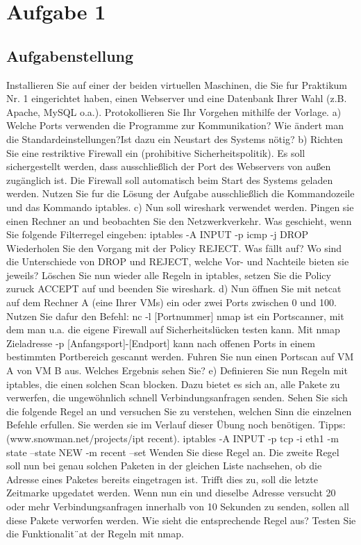 \newpage
\section{Aufgabe 1}
\subsection{Aufgabenstellung}
Installieren Sie auf einer der beiden virtuellen Maschinen, die Sie fur Praktikum Nr. 1 eingerichtet haben, einen Webserver und eine Datenbank Ihrer Wahl (z.B. Apache, MySQL o.a.). Protokollieren Sie Ihr Vorgehen mithilfe der Vorlage.
a) Welche Ports verwenden die Programme zur Kommunikation? Wie ändert man die Standardeinstellungen?Ist dazu ein Neustart des Systems nötig?
b) Richten Sie eine restriktive Firewall ein (prohibitive Sicherheitspolitik). Es soll sichergestellt werden, dass ausschließlich der Port des Webservers von außen zugänglich ist. Die Firewall soll automatisch beim Start des Systems geladen werden. Nutzen Sie fur die Lösung der Aufgabe ausschließlich die Kommandozeile und das Kommando iptables.
c) Nun soll wireshark verwendet werden. Pingen sie einen Rechner an und beobachten Sie den Netzwerkverkehr. Was geschieht, wenn Sie folgende Filterregel eingeben: iptables -A INPUT -p icmp -j DROP Wiederholen Sie den Vorgang mit der Policy REJECT. Was fällt auf? Wo sind die Unterschiede von DROP und REJECT, welche Vor- und Nachteile bieten sie jeweils? Löschen Sie nun wieder alle Regeln in iptables, setzen Sie die Policy zuruck ACCEPT auf und beenden Sie wireshark.
d) Nun öffnen Sie mit netcat auf dem Rechner A (eine Ihrer VMs) ein oder zwei Ports zwischen 0 und 100. Nutzen Sie dafur den Befehl: nc -l [Portnummer] nmap ist ein Portscanner, mit dem man u.a. die eigene Firewall auf Sicherheitslücken testen kann. Mit nmap Zieladresse -p [Anfangsport]-[Endport] kann nach offenen Ports in einem bestimmten Portbereich gescannt werden. Fuhren Sie nun einen Portscan auf VM A von VM B aus. Welches Ergebnis sehen Sie?
e) Definieren Sie nun Regeln mit iptables, die einen solchen Scan blocken. Dazu bietet es sich an, alle Pakete zu verwerfen, die ungewöhnlich schnell Verbindungsanfragen senden. Sehen Sie sich die folgende Regel an und versuchen Sie zu verstehen, welchen Sinn die einzelnen Befehle erfullen. Sie werden sie im Verlauf dieser Übung noch benötigen. Tipps: (www.snowman.net/projects/ipt recent). iptables -A INPUT -p tcp -i eth1 -m state --state NEW -m recent --set Wenden Sie diese Regel an. Die zweite Regel soll nun bei genau solchen Paketen in der gleichen Liste nachsehen, ob die Adresse eines Paketes bereits eingetragen ist. Trifft dies zu, soll die letzte Zeitmarke upgedatet werden. Wenn nun ein und dieselbe Adresse versucht 20 oder mehr Verbindungsanfragen innerhalb von 10 Sekunden zu senden, sollen all diese Pakete verworfen werden. Wie sieht die entsprechende Regel aus? Testen Sie die Funktionalit¨at der Regeln mit nmap.
